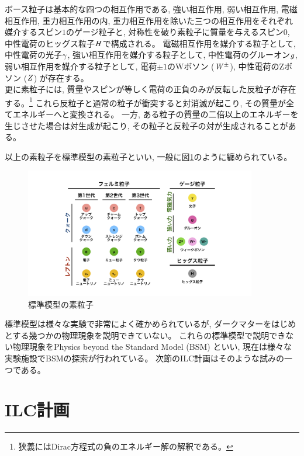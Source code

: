 ボース粒子は基本的な四つの相互作用である, 強い相互作用, 弱い相互作用, 電磁相互作用, 重力相互作用の内, 重力相互作用を除いた三つの相互作用をそれぞれ媒介するスピン$1$のゲージ粒子と, 対称性を破り素粒子に質量を与えるスピン$0$, 中性電荷のヒッグス粒子$\it H$で構成される。
電磁相互作用を媒介する粒子として, 中性電荷の光子$\it \gamma$, 強い相互作用を媒介する粒子として, 中性電荷のグルーオン$\it g$, 弱い相互作用を媒介する粒子として, 電荷$\pm 1$のWボソン ($\it W^{\pm}$), 中性電荷のZボソン ($\it Z$) が存在する。\\

更に素粒子には, 質量やスピンが等しく電荷の正負のみが反転した反粒子が存在する。\footnote{狭義にはDirac方程式の負のエネルギー解の解釈である。}
これら反粒子と通常の粒子が衝突すると対消滅が起こり, その質量が全てエネルギーへと変換される。
一方, ある粒子の質量の二倍以上のエネルギーを生じさせた場合は対生成が起こり, その粒子と反粒子の対が生成されることがある。

以上の素粒子を標準模型の素粒子といい, 一般に図\ref{1SMParticle}のように纏められている。

\begin{figure}[htbp]
 \centering
 \includegraphics[width=0.9\textwidth]{Figure/1Introduction/1SMParticle.png}
 \caption{標準模型の素粒子}
 \label{1SMParticle}
\end{figure}

標準模型は様々な実験で非常によく確かめられているが, ダークマターをはじめとする幾つかの物理現象を説明できていない。
これらの標準模型で説明できない物理現象をPhysics beyond the Standard Model (BSM) といい, 現在は様々な実験施設でBSMの探索が行われている。
次節のILC計画はそのような試みの一つである。


\section{ILC計画} \label{Intro:InternationalLinearColliderProject}

